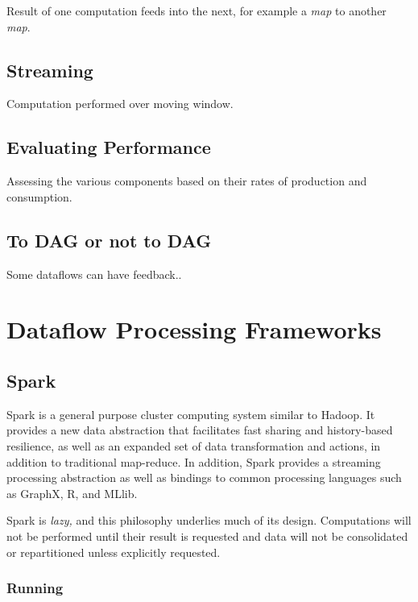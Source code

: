 Result of one computation feeds into the next, for example a \emph{map}
to another \emph{map}.

\subsection{Streaming}\label{streaming}

Computation performed over moving window.

\subsection{Evaluating Performance}\label{evaluating-performance}

Assessing the various components based on their rates of production and
consumption.

\subsection{To DAG or not to DAG}\label{to-dag-or-not-to-dag}

Some dataflows can have feedback..

\section{Dataflow Processing
Frameworks}\label{dataflow-processing-frameworks}

\subsection{Spark}\label{spark}

Spark is a general purpose cluster computing system similar to Hadoop.
It provides a new data abstraction that facilitates fast sharing and
history-based resilience, as well as an expanded set of data
transformation and actions, in addition to traditional map-reduce. In
addition, Spark provides a streaming processing abstraction as well as
bindings to common processing languages such as GraphX, R, and MLlib.

Spark is \emph{lazy,} and this philosophy underlies much of its design.
Computations will not be performed until their result is requested and
data will not be consolidated or repartitioned unless explicitly
requested.

\subsubsection{Running}\label{running}

